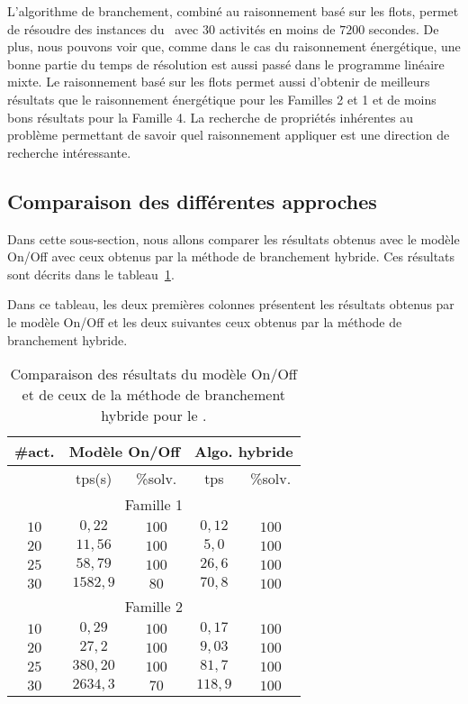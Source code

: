 L'algorithme de branchement, combiné au raisonnement basé sur les
flots, permet de résoudre des instances du \CECSP~avec $30$ activités en
moins de $7200$ secondes. De plus, nous pouvons voir que, comme dans
le cas du raisonnement énergétique, une bonne
partie du temps de résolution est aussi passé dans le programme linéaire
mixte. Le raisonnement basé sur les flots permet aussi d'obtenir de
meilleurs résultats que le raisonnement énergétique pour les Familles 2
et 1 et de moins bons résultats pour la Famille 4. La recherche de
propriétés inhérentes au problème permettant de savoir quel 
raisonnement appliquer est une direction de recherche intéressante. 

\subsection{Comparaison des différentes approches}

Dans cette sous-section, nous allons comparer les résultats obtenus avec le
modèle On/Off avec ceux obtenus par la méthode de branchement
hybride. Ces résultats sont décrits dans le
tableau~\ref{tab:comp_OOBB}.

Dans ce tableau, les deux premières colonnes présentent les résultats
obtenus par le modèle On/Off et les deux suivantes ceux obtenus par
la méthode de branchement hybride.   
\begin{table}[!htb]
  \begin{center}
    \begin{tabular}{|c|cc|cc|}
      \hline
      \#act. & \multicolumn{2}{c|}{Modèle On/Off}&
                                                    \multicolumn{2}{c|}{Algo. hybride}\\ 
      \hline 
              & tps(s) &\%solv. & tps & \%solv.\\ 
      \hline
      \multicolumn{5}{|c|}{Famille 1}\\
      \hline 
      $10 $& $0,22$ & $100$ & $0,12$ &  $100$ \\ 
      $20 $& $11,56$ & $100$ & $5,0$ & $100$ \\ 
      $25 $& $58,79$ & $100$ & $26,6$ &$100 $ \\ 
      $30 $& $1582,9$ & $80$ & $70,8$ & $100 $ \\  
      \hline 
      \multicolumn{5}{|c|}{Famille 2}\\
      \hline 
      $10 $& $0,29$ & $100$ & $0,17$ &$100 $ \\ 
      $20 $& $27,2$ & $100$ & $9,03$&$100 $ \\ 
      $25 $& $380,20$ & $100$ & $81,7$ &$100 $ \\ 
      $30 $& $2634,3$ & $70$ & $118,9$ &$100 $ \\  
      \hline 
    \end{tabular}
  \end{center}
  \caption{Comparaison des résultats du modèle On/Off et de ceux de la
    méthode de branchement hybride pour le \CECSP.}
  \label{tab:comp_OOBB}
\end{table}

